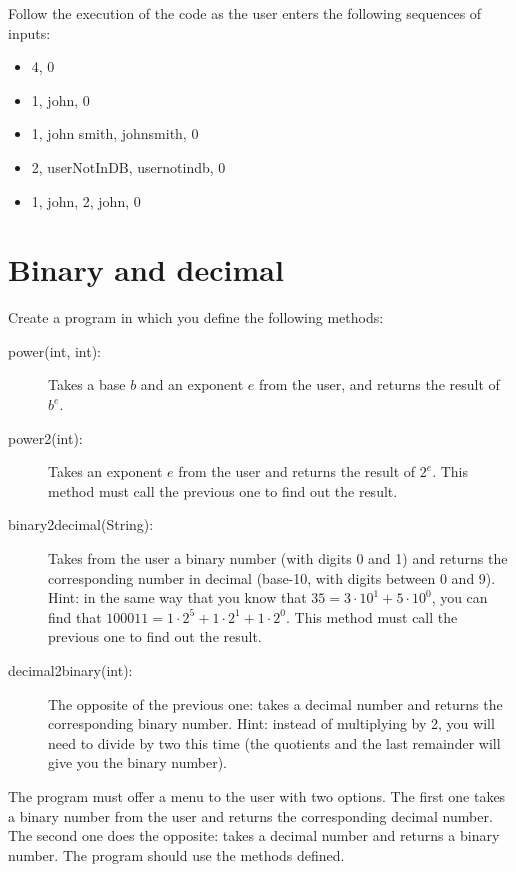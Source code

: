 \documentclass{article}
\begin{document}
Follow the execution of the code as the user enters the following
sequences of inputs:

\begin{itemize}
\item 4, 0
\item 1, john, 0
\item 1, john smith, johnsmith, 0
\item 2, userNotInDB, usernotindb, 0
\item 1, john, 2, john, 0
\end{itemize}



\section{Binary and decimal}
\label{sec:from-10011-19}

Create a program in which you define the following methods: 

\begin{description}
\item[power(int, int): ] Takes a base $b$ and an
  exponent $e$ from the user, and returns the result of $b^e$.
\item[power2(int): ] Takes an exponent $e$ from the user and returns the
  result of $2^e$. This method must call the previous one to find out
  the result. 
\item[binary2decimal(String):] Takes from the user a binary number
  (with digits 0 and 1) and returns the corresponding number in
  decimal (base-10, with digits between 0 and 9).  Hint: in the same
  way that you know that $35 = 3 \cdot 10^1 + 5 \cdot 10^0$, you can find that
  $100011 = 1 \cdot 2^5 + 1 \cdot 2^1 + 1 \cdot 2^0$. This method must
  call the previous one to find out the result. 
\item[decimal2binary(int):] The opposite of the previous one: takes a
  decimal number and returns the corresponding binary number.  Hint:
  instead of multiplying by 2, you will need to divide by two this
  time (the quotients and the last remainder will give you the binary
  number).
\end{description}

The program must offer a menu to the user with two options. 
The first one takes a binary number from the
user and returns the corresponding decimal number. The second one does
the opposite: takes a decimal number and returns a binary number. The
program should use the methods defined. 
\end{document}
